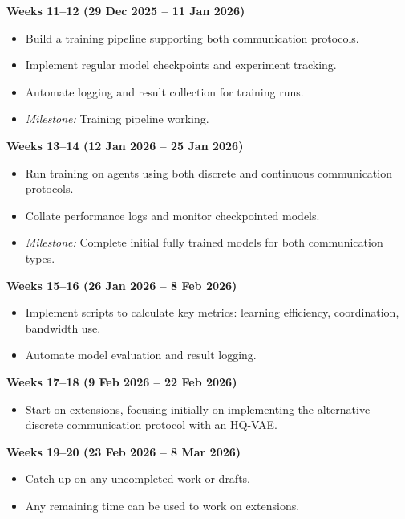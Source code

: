 \documentclass[20pt]{article}
\begin{document}
\begin{list}{}{\leftmargin=0cm \itemindent=0cm}
\item \textbf{Weeks 11--12 (29 Dec 2025 -- 11 Jan 2026)}
\begin{itemize}
\item Build a training pipeline supporting both communication protocols.
\item Implement regular model checkpoints and experiment tracking.
\item Automate logging and result collection for training runs.
\item \textit{Milestone:} Training pipeline working.
\end{itemize}

\item \textbf{Weeks 13--14 (12 Jan 2026 -- 25 Jan 2026)}
\begin{itemize}
\item Run training on agents using both discrete and continuous communication protocols.
\item Collate performance logs and monitor checkpointed models.
\item \textit{Milestone:} Complete initial fully trained models for both communication types.
\end{itemize}

\item \textbf{Weeks 15--16 (26 Jan 2026 -- 8 Feb 2026)}
\begin{itemize}
\item Implement scripts to calculate key metrics: learning efficiency, coordination, bandwidth use.
\item Automate model evaluation and result logging.
\end{itemize}

\item \textbf{Weeks 17--18 (9 Feb 2026 -- 22 Feb 2026)}
\begin{itemize}
\item Start on extensions, focusing initially on implementing the alternative discrete communication protocol with an HQ-VAE.
\end{itemize}


\item \textbf{Weeks 19--20 (23 Feb 2026 -- 8 Mar 2026)}
\begin{itemize}
\item Catch up on any uncompleted work or drafts.
\item Any remaining time can be used to work on extensions.
\end{itemize}



\end{list}
\end{document}
